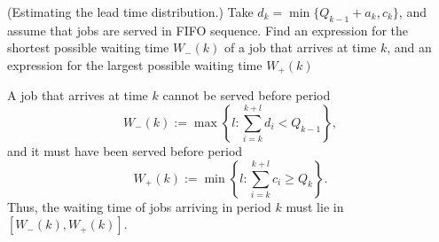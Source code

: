\begin{question} (Estimating the lead time distribution.)  Take
  $d_k = \min\{Q_{k-1}+a_k, c_k\}$, and assume that jobs are served in
  FIFO sequence. Find an expression for the shortest possible waiting
  time $W_-(k)$ of a job that arrives at time $k$, and an expression
  for the largest possible waiting time $W_+(k)$
    \begin{solution}
    A job that arrives at time $k$ cannot be served before period
    \begin{equation*}
    W_-(k):= \max\left\{l: \sum_{i=k}^{k+l} d_i < Q_{k-1}\right\},
    \end{equation*}
and it must have been  served before period
    \begin{equation*}
      W_+(k):= \min\left\{l: \sum_{i=k}^{k+l} c_i \geq
        Q_{k}\right\}.
    \end{equation*}
    Thus, the waiting time of jobs arriving in period $k$ must lie in
    $[W_-(k), W_+(k)]$.
  \end{solution}
\end{question}

